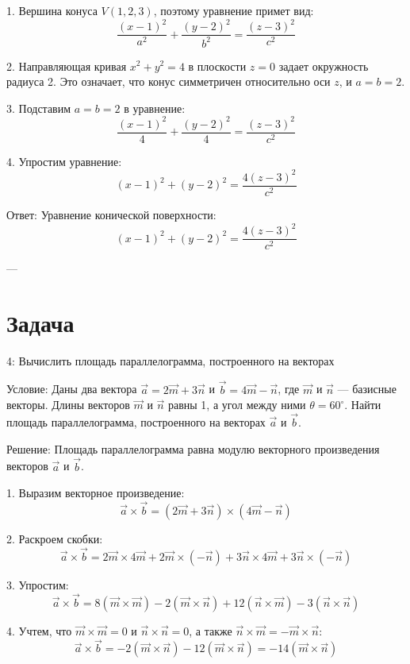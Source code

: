 \documentclass[a4paper,14pt]{extreport} %
\begin{document}
1. Вершина конуса \( V(1, 2, 3) \), поэтому уравнение примет вид:
   \[
   \frac{(x - 1)^2}{a^2} + \frac{(y - 2)^2}{b^2} = \frac{(z - 3)^2}{c^2}
   \]

2. Направляющая кривая \( x^2 + y^2 = 4 \) в плоскости \( z = 0 \) задает окружность радиуса 2.  
   Это означает, что конус симметричен относительно оси \( z \), и \( a = b = 2 \).

3. Подставим \( a = b = 2 \) в уравнение:
   \[
   \frac{(x - 1)^2}{4} + \frac{(y - 2)^2}{4} = \frac{(z - 3)^2}{c^2}
   \]

4. Упростим уравнение:
   \[
   (x - 1)^2 + (y - 2)^2 = \frac{4(z - 3)^2}{c^2}
   \]

 Ответ:   
Уравнение конической поверхности:
\[
(x - 1)^2 + (y - 2)^2 = \frac{4(z - 3)^2}{c^2}
\]

---

    \section*{Задача}4: Вычислить площадь параллелограмма, построенного на векторах

 Условие:   
Даны два вектора \( \vec{a} = 2\vec{m} + 3\vec{n} \) и \( \vec{b} = 4\vec{m} - \vec{n} \), где \( \vec{m} \) и \( \vec{n} \) — базисные векторы.  
Длины векторов \( \vec{m} \) и \( \vec{n} \) равны 1, а угол между ними \( \theta = 60^\circ \).  
Найти площадь параллелограмма, построенного на векторах \( \vec{a} \) и \( \vec{b} \).

 Решение:   
Площадь параллелограмма равна модулю векторного произведения векторов \( \vec{a} \) и \( \vec{b} \).

1. Выразим векторное произведение:
   \[
   \vec{a} \times \vec{b} = (2\vec{m} + 3\vec{n}) \times (4\vec{m} - \vec{n})
   \]

2. Раскроем скобки:
   \[
   \vec{a} \times \vec{b} = 2\vec{m} \times 4\vec{m} + 2\vec{m} \times (-\vec{n}) + 3\vec{n} \times 4\vec{m} + 3\vec{n} \times (-\vec{n})
   \]

3. Упростим:
   \[
   \vec{a} \times \vec{b} = 8(\vec{m} \times \vec{m}) - 2(\vec{m} \times \vec{n}) + 12(\vec{n} \times \vec{m}) - 3(\vec{n} \times \vec{n})
   \]

4. Учтем, что \( \vec{m} \times \vec{m} = 0 \) и \( \vec{n} \times \vec{n} = 0 \), а также \( \vec{n} \times \vec{m} = -\vec{m} \times \vec{n} \):
   \[
   \vec{a} \times \vec{b} = -2(\vec{m} \times \vec{n}) - 12(\vec{m} \times \vec{n}) = -14(\vec{m} \times \vec{n})
   \]
\end{document}
